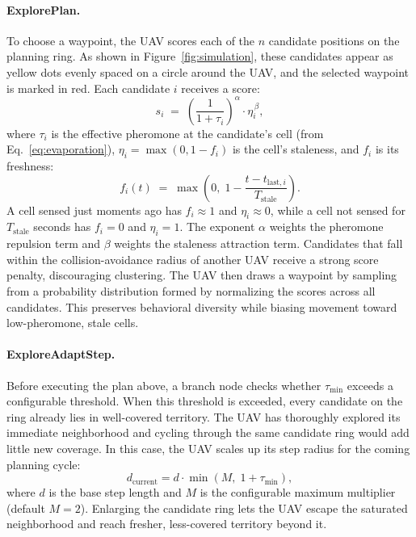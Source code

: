 \documentclass[10pt,a4paper,twocolumn]{article}
\begin{document}
\paragraph{ExplorePlan.}
To choose a waypoint, the UAV scores each of the $n$ candidate positions on the planning ring. As shown in Figure~\ref{fig:simulation}, these candidates appear as yellow dots evenly spaced on a circle around the UAV, and the selected waypoint is marked in red. Each candidate $i$ receives a score:
\begin{equation}
    s_i \;=\; \left(\frac{1}{1 + \tau_i}\right)^{\!\alpha} \cdot \eta_i^{\,\beta},
    \label{eq:aco}
\end{equation}
where $\tau_i$ is the effective pheromone at the candidate's cell (from Eq.~\eqref{eq:evaporation}), $\eta_i = \max(0, 1 - f_i)$ is the cell's staleness, and $f_i$ is its freshness:
\begin{equation}
    f_i(t) \;=\; \max\!\left(0,\;1 - \frac{t - t_{\mathrm{last},i}}{T_{\mathrm{stale}}}\right).
    \label{eq:freshness}
\end{equation}
A cell sensed just moments ago has $f_i \approx 1$ and $\eta_i \approx 0$, while a cell not sensed for $T_{\mathrm{stale}}$ seconds has $f_i = 0$ and $\eta_i = 1$. The exponent $\alpha$ weights the pheromone repulsion term and $\beta$ weights the staleness attraction term. Candidates that fall within the collision-avoidance radius of another UAV receive a strong score penalty, discouraging clustering. The UAV then draws a waypoint by sampling from a probability distribution formed by normalizing the scores across all candidates. This preserves behavioral diversity while biasing movement toward low-pheromone, stale cells.

\paragraph{ExploreAdaptStep.}
Before executing the plan above, a branch node checks whether $\tau_{\min}$ exceeds a configurable threshold. When this threshold is exceeded, every candidate on the ring already lies in well-covered territory. The UAV has thoroughly explored its immediate neighborhood and cycling through the same candidate ring would add little new coverage. In this case, the UAV scales up its step radius for the coming planning cycle:
\begin{equation}
    d_{\mathrm{current}} = d \cdot \min\!\left(M,\; 1 + \tau_{\min}\right),
    \label{eq:adaptstep}
\end{equation}
where $d$ is the base step length and $M$ is the configurable maximum multiplier (default $M = 2$). Enlarging the candidate ring lets the UAV escape the saturated neighborhood and reach fresher, less-covered territory beyond it.
\end{document}
